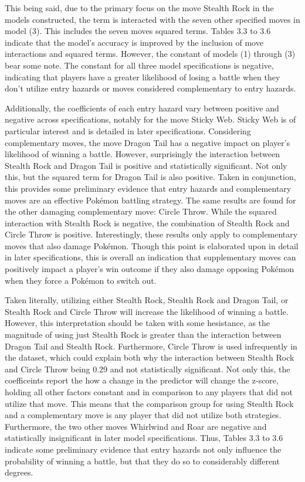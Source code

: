 \documentclass[12pt,twoside]{reedthesis}
\begin{document}
  This being said, due to the primary focus on the move Stealth Rock in
  the models constructed, the term is interacted with the seven other
  specified moves in model (3). This includes the seven moves squared
  terms. Tables 3.3 to 3.6 indicate that the model's accuracy is improved
  by the inclusion of move interactions and squared terms. However, the
  constant of models (1) through (3) bear some note. The constant for all
  three model specifications is negative, indicating that players have a
  greater likelihood of losing a battle when they don't utilize entry
  hazards or moves considered complementary to entry hazards.
  
  Additionally, the coefficients of each entry hazard vary between
  positive and negative across specifications, notably for the move Sticky
  Web. Sticky Web is of particular interest and is detailed in later
  specifications. Considering complementary moves, the move Dragon Tail
  has a negative impact on player's likelihood of winning a battle.
  However, surprisingly the interaction between Stealth Rock and Dragon
  Tail is positive and statistically significant. Not only this, but the
  squared term for Dragon Tail is also positive. Taken in conjunction,
  this provides some preliminary evidence that entry hazards and
  complementary moves are an effective Pokémon battling strategy. The same
  results are found for the other damaging complementary move: Circle
  Throw. While the squared interaction with Stealth Rock is negative, the
  combination of Stealth Rock and Circle Throw is positive. Interestingly,
  these results only apply to complementary moves that also damage
  Pokémon. Though this point is elaborated upon in detail in later
  specifications, this is overall an indication that supplementary moves
  can positively impact a player's win outcome if they also damage
  opposing Pokémon when they force a Pokémon to switch out.
  
  Taken literally, utilizing either Stealth Rock, Stealth Rock and Dragon
  Tail, or Stealth Rock and Circle Throw will increase the likelihood of
  winning a battle. However, this interpretation should be taken with some
  hesistance, as the magnitude of using just Stealth Rock is greater than
  the interaction between Dragon Tail and Stealth Rock. Furthermore,
  Circle Throw is used infrequently in the dataset, which could explain
  both why the interaction between Stealth Rock and Circle Throw being
  0.29 and not statistically significant. Not only this, the coefficeints
  report the how a change in the predictor will change the z-score,
  holding all other factors constant and in comparison to any players that
  did not utilize that move. This means that the comparison group for
  using Stealth Rock and a complementary move is any player that did not
  utilize both strategies. Furthermore, the two other moves Whirlwind and
  Roar are negative and statistically insignificant in later model
  specifications. Thus, Tables 3.3 to 3.6 indicate some preliminary
  evidence that entry hazards not only influence the probability of
  winning a battle, but that they do so to considerably different degrees.
  
\end{document}
